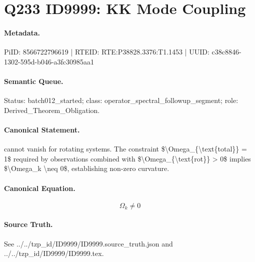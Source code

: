 \section*{Q233 ID9999: KK Mode Coupling}
\paragraph{Metadata.}
PiID: 8566722796619 | RTEID: RTE:P38828.3376:T1.1453 | UUID: c38c8846-1302-595d-b046-a3fc30985aa1

\paragraph{Semantic Queue.}
Status: batch012\_started; class: operator\_spectral\_followup\_segment; role: Derived\_Theorem\_Obligation.

\paragraph{Canonical Statement.}
cannot vanish for rotating systems. The constraint \$\textbackslash{}Omega\_\{\textbackslash{}text\{total\}\} = 1\$ required by observations combined with \$\textbackslash{}Omega\_\{\textbackslash{}text\{rot\}\} > 0\$ implies \$\textbackslash{}Omega\_k \textbackslash{}neq 0\$, establishing non-zero curvature.

\paragraph{Canonical Equation.}
\[
\Omega_k \neq 0
\]

\paragraph{Source Truth.}
See ../../tzp\_id/ID9999/ID9999.source\_truth.json and ../../tzp\_id/ID9999/ID9999.tex.
